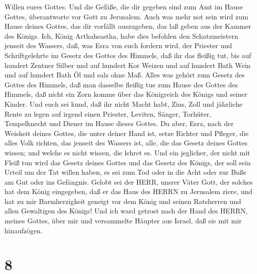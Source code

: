 Willen eures Gottes.  Und die Gefäße, die dir gegeben sind
zum Amt im Hause Gottes, überantworte vor Gott zu Jerusalem.
 Auch was mehr not sein wird zum Hause deines Gottes, das
dir vorfällt auszugeben, das laß geben aus der Kammer des Königs.
 Ich, König Arthahsastha, habe dies befohlen den
Schatzmeistern jenseit des Wassers, daß, was Esra von euch fordern wird,
der Priester und Schriftgelehrte im Gesetz des Gottes des Himmels, daß
ihr das fleißig tut,  bis auf hundert Zentner Silber und
auf hundert Kor Weizen und auf hundert Bath Wein und auf hundert Bath Öl
und salz ohne Maß.  Alles was gehört zum Gesetz des Gottes
des Himmels, daß man dasselbe fleißig tue zum Hause des Gottes des
Himmels, daß nicht ein Zorn komme über das Königreich des Königs und
seiner Kinder.  Und euch sei kund, daß ihr nicht Macht
habt, Zins, Zoll und jährliche Rente zu legen auf irgend einen Priester,
Leviten, Sänger, Torhüter, Tempelknecht und Diener im Hause dieses
Gottes.  Du aber, Esra, nach der Weisheit deines Gottes,
die unter deiner Hand ist, setze Richter und Pfleger, die alles Volk
richten, das jenseit des Wassers ist, alle, die das Gesetz deines Gottes
wissen; und welche es nicht wissen, die lehret es.  Und ein
jeglicher, der nicht mit Fleiß tun wird das Gesetz deines Gottes und das
Gesetz des Königs, der soll sein Urteil um der Tat willen haben, es sei
zum Tod oder in die Acht oder zur Buße am Gut oder ins Gefängnis.
 Gelobt sei der HERR, unsrer Väter Gott, der solches hat
dem König eingegeben, daß er das Haus des HERRN zu Jerusalem ziere,
 und hat zu mir Barmherzigkeit geneigt vor dem König und
seinen Ratsherren und allen Gewaltigen des Königs! Und ich ward getrost
nach der Hand des HERRN, meines Gottes, über mir und versammelte Häupter
aus Israel, daß sie mit mir hinaufzögen.

\hypertarget{section-7}{%
\section{8}\label{section-7}}


